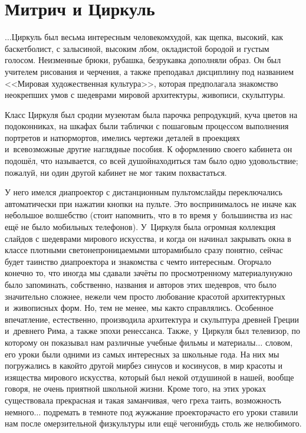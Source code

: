 \newpage
\section*{Митрич и Циркуль}

$\ldots$Циркуль был весьма интересным человеком\mdash худой, как щепка, высокий, как баскетболист, с залысиной, высоким лбом, окладистой бородой и густым голосом. Неизменные брюки, рубашка, безрукавка дополняли образ. Он был учителем рисования и черчения, а также преподавал дисциплину под названием <<Мировая художественная культура>>, которая предполагала знакомство неокрепших умов с шедеврами мировой архитектуры, живописи, скульптуры. 

Класс Циркуля был сродни музею\mdash там была парочка репродукций, куча цветов на подоконниках, на шкафах были таблички с пошаговым процессом выполнения портретов и натюрмортов, имелись чертежи деталей в проекциях и~всевозможные другие наглядные пособия. К оформлению своего кабинета он подошёл, что называется, со всей душой\mdash находиться там было одно удовольствие; пожалуй, ни один другой кабинет не мог таким похвастаться. 

У него имелся диапроектор с дистанционным пультом\mdash слайды переключались автоматически при нажатии кнопки на пульте. Это воспринималось не иначе как небольшое волшебство (стоит напомнить, что в то время у~большинства из нас ещё не было мобильных телефонов). У~Циркуля была огромная коллекция слайдов с шедеврами мирового искусства, и когда он начинал закрывать окна в классе плотными светонепроницаемыми шторами\mdash было сразу понятно, сейчас будет таинство диапроектора и знакомства с чем\sdash то интересным. Огорчало конечно то, что иногда мы сдавали зачёты по просмотренному материалу\mdash нужно было запоминать, собственно, названия и авторов этих шедевров, что было значительно сложнее, нежели чем просто любование красотой архитектурных и~живописных форм. Но, тем не менее, мы как\sdash то справлялись. Особенное впечатление, естественно, производила архитектура и скульптура древней Греции и~древнего Рима, а также эпохи ренессанса. Также, у~Циркуля был телевизор, по которому он показывал нам различные учебные фильмы и материалы$\ldots$ словом, его уроки были одними из самых интересных за школьные года. На них мы погружались в какой\sdash то другой мир\mdash без синусов и косинусов, в мир красоты и изящества мирового искусства, который был некой отдушиной в нашей, вообще говоря, не очень приятной школьной жизни. Кроме того, на этих уроках существовала прекрасная и такая заманчивая, чего греха таить, возможность немного$\ldots$ подремать в темноте под жужжание проектора\mdash часто его уроки ставили нам после омерзительной физкультуры или ещё чего\sdash нибудь столь же нелюбимого.

